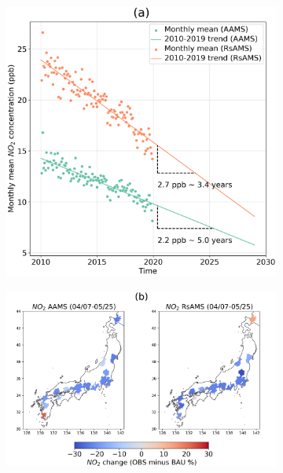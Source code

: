 \begin{figure}[tbh!]
    \centering
    \begin{subfigure}{.5\textwidth}
      \centering
      \includegraphics[width=\textwidth]{figs/chap4/fig4a.png}
      \label{fig:chap4_fig4a}
    \end{subfigure}%
    \begin{subfigure}{.5\textwidth}
      \centering
      \includegraphics[width=\textwidth]{figs/chap4/fig4b.png}
      \label{fig:chap4_fig4b}
    \end{subfigure}


\end{figure}
